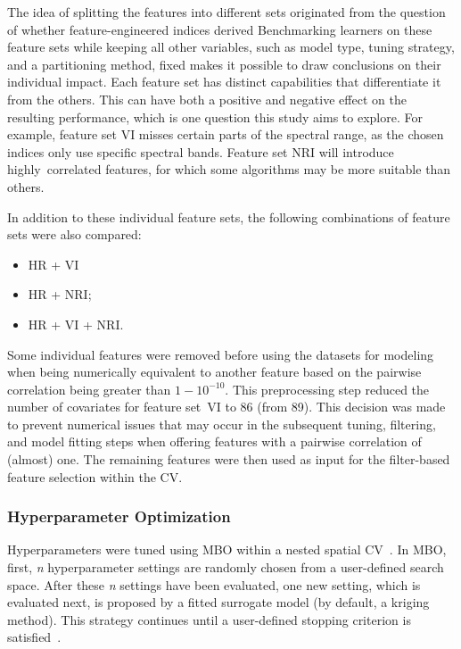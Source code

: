 \documentclass[remotesensing,article,accept,moreauthors,pdftex]{Definitions/mdpi}
\begin{document}
\begin{paracol}{2}
The idea of splitting the features into different sets originated from the question of whether feature-engineered indices derived 
Benchmarking learners on these feature sets while keeping all other variables, such as model type, tuning strategy, and a partitioning method, fixed makes it possible to draw conclusions on their individual impact.
Each feature set has distinct capabilities that differentiate it from the others.
This can have both a positive and negative effect on the resulting performance, which is one question this study aims to explore.
For example, feature set VI misses certain parts of the spectral range, as the chosen indices only use specific spectral bands.
Feature set NRI will introduce highly\ correlated features, for which some algorithms may be more suitable than others.

In addition to these individual feature sets, the following combinations of feature sets were also compared:

\begin{itemize}
	\item HR + VI %
	\item HR + NRI;
	\item HR + VI + NRI.
\end{itemize}

Some individual features were removed before using the datasets for modeling when being numerically equivalent to another feature based on the pairwise correlation being greater than $1 - 10^{-10}$.
This preprocessing step reduced the number of covariates for feature set~VI to 86 (from 89).
This decision was made to prevent numerical issues that may occur in the subsequent tuning, filtering, and model fitting steps when offering features with a pairwise correlation of (almost) one.
The remaining features were then used as input for the filter-based feature selection within the CV.


\subsubsection{Hyperparameter Optimization}

Hyperparameters were tuned using \ac{MBO} within a nested spatial \ac{CV}~\cite{mlrmbo, binder2020, schratz2019}.
In MBO, first, \textit{n} hyperparameter settings are randomly chosen from a user-defined search space.
After these \textit{n} settings have been evaluated, one new setting, which is evaluated next, is proposed by a fitted surrogate model (by default, a kriging method).
This strategy continues until a user-defined stopping criterion is satisfied~\cite{hutter2011, jones1998}.


\end{paracol}
\end{document}
